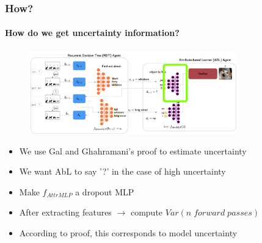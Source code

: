 \documentclass[9pt]{beamer}
\begin{document}
\begin{frame}
\frametitle{How?}
\framesubtitle{How do we get uncertainty information?}\begin{figure}
	\centering
	\includegraphics[width=0.8\textwidth]{images/where_is_uncertainty.pdf} 
\end{figure}
\begin{itemize}
	\item We use Gal and Ghahramani's \cite{gal2016dropout} proof to estimate uncertainty 
	\item We want AbL to say '?' in the case of high uncertainty
	\item Make $f_{AttrMLP}$ a dropout MLP
	\item After extracting features $\rightarrow$ compute $Var(n \;forward\;passes)$
	\item According to proof, this corresponds to model uncertainty
\end{itemize}
\end{frame}






\end{document}
